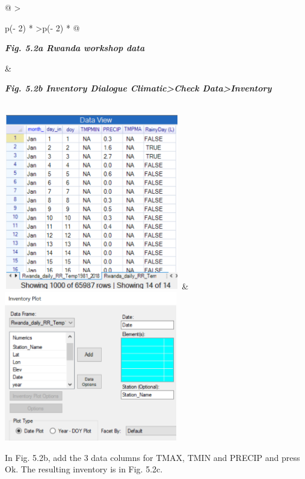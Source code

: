 \documentclass[
  letterpaper,
  DIV=11,
  numbers=noendperiod]{scrreprt}
\begin{document}
\begin{longtable}[]{@{}
  >{\raggedright\arraybackslash}p{(\columnwidth - 2\tabcolsep) * }
  >{\centering\arraybackslash}p{(\columnwidth - 2\tabcolsep) * }@{}}
\toprule\noalign{}
\begin{minipage}[b]{\linewidth}\raggedright
\textbf{\emph{Fig. 5.2a Rwanda workshop data}}
\end{minipage} & \begin{minipage}[b]{\linewidth}\centering
\textbf{\emph{Fig. 5.2b Inventory Dialogue Climatic\textgreater Check
Data\textgreater Inventory}}
\end{minipage} \\
\midrule\noalign{}
\endhead
\bottomrule\noalign{}
\endlastfoot
\includegraphics[width=3.01611in,height=3.01611in]{figures/Fig5.2a.png}
&
\includegraphics[width=2.97338in,height=2.57557in]{figures/Fig5.2b.png} \\
\end{longtable}

In Fig. 5.2b, add the 3 data columns for TMAX, TMIN and PRECIP and press
Ok. The resulting inventory is in Fig. 5.2c.
\end{document}
